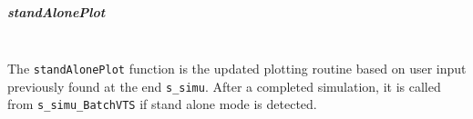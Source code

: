 \documentclass[12pt]{article}
\begin{document}
\subparagraph{standAlonePlot} \ \\
The \verb|standAlonePlot| function is the updated plotting routine based on user input previously found at the end \verb|s_simu|.
After a completed simulation, it is called from \verb|s_simu_BatchVTS| if stand alone mode is detected.

\end{document}

